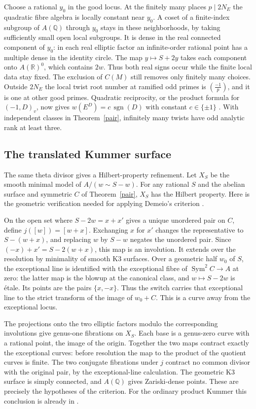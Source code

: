 \documentclass[11pt]{article}
\newcommand{\Q}{\mathbb Q}\newcommand{\F}{\mathbb F}\newcommand{\Z}{\mathbb Z}
\begin{document}
Choose a rational $y_0$ in the good locus. At the finitely many places $p\mid 2N_E$ the quadratic fibre algebra is locally constant near $y_0$. A coset of a finite-index subgroup of $A(\Q)$ through $y_0$ stays in these neighborhoods, by taking sufficiently small open local subgroups. It is dense in the real connected component of $y_0$: in each real elliptic factor an infinite-order rational point has a multiple dense in the identity circle. The map $y\mapsto S+2y$ takes each component onto $A(\mathbb R)^0$, which contains $2w$. Thus both real signs occur while the finite local data stay fixed. The exclusion of $C(M)$ still removes only finitely many choices. Outside $2N_E$ the local twist root number at ramified odd primes is $(\frac{-1}{p})$, and it is one at other good primes. Quadratic reciprocity, or the product formula for $(-1,D)_v$, now gives $w(E^D)=c\,\operatorname{sgn}(D)$ with constant $c\in\{\pm1\}$ \cite{root}. With independent classes in Theorem~\ref{pair}, infinitely many twists have odd analytic rank at least three.

\subsection{The translated Kummer surface}
The same theta divisor gives a Hilbert-property refinement. Let $X_S$ be the smooth minimal model of $A/(w\sim S-w)$. For any rational $S$ and the abelian surface and symmetric $C$ of Theorem~\ref{pair}, $X_S$ has the Hilbert property. Here is the geometric verification needed for applying Demeio's criterion \cite[Theorem~1.2]{demeio}.

On the open set where $S-2w=x+x'$ gives a unique unordered pair on $C$, define $j([w])=[w+x]$. Exchanging $x$ for $x'$ changes the representative to $S-(w+x)$, and replacing $w$ by $S-w$ negates the unordered pair. Since $(-x)+x'=S-2(w+x)$, this map is an involution. It extends over the resolution by minimality of smooth K3 surfaces. Over a geometric half $w_0$ of $S$, the exceptional line is identified with the exceptional fibre of $\operatorname{Sym}^2 C\to A$ at zero: the latter map is the blowup at the canonical class, and $w\mapsto S-2w$ is \'etale. Its points are the pairs $\{x,-x\}$. Thus the switch carries that exceptional line to the strict transform of the image of $w_0+C$. This is a curve away from the exceptional locus.

The projections onto the two elliptic factors modulo the corresponding involutions give genus-one fibrations on $X_S$. Each base is a genus-zero curve with a rational point, the image of the origin. Together the two maps contract exactly the exceptional curves: before resolution the map to the product of the quotient curves is finite. The two conjugate fibrations under $j$ contract no common divisor with the original pair, by the exceptional-line calculation. The geometric K3 surface is simply connected, and $A(\Q)$ gives Zariski-dense points. These are precisely the hypotheses of the criterion. For the ordinary product Kummer this conclusion is already in \cite[Prop.~4.2.1]{demeio}.
\end{document}
